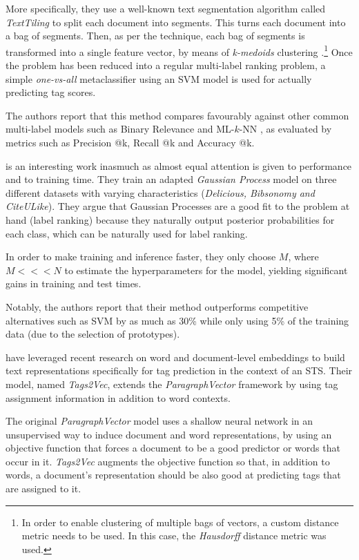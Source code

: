 More specifically, they use a well-known text segmentation algorithm called \textit{TextTiling} \citep{hearst_1994} to split each document into segments. This turns each document into a bag of segments. Then, as per the technique, each bag of segments is transformed into a single feature vector, by means of \textit{k-medoids} clustering \citep{kaufmanl_rousseeuw_1987}.\footnote{In order to enable clustering of multiple bags of vectors, a custom distance metric needs to be used. In this case, the  \textit{Hausdorff} distance metric \citep{huttenlocher_etal_1993} was used.} Once the problem has been reduced into a regular multi-label ranking problem, a simple \textit{one-vs-all} metaclassifier using an SVM model is used for actually predicting  tag scores.

The authors report that this method compares favourably against other common multi-label models such as Binary Relevance and ML-$k$-NN \citep{zhang_zhou_2007}, as evaluated by metrics such as Precision @k, Recall @k and Accuracy @k.

\cite{song_etal_2011} is an interesting work inasmuch as almost equal attention is given to performance and to training time. They train an adapted \textit{Gaussian Process} model on three different datasets with varying characteristics (\textit{Delicious, Bibsonomy and CiteULike}). They argue that Gaussian Processes are a good fit to the problem at hand (label ranking) because they naturally output posterior probabilities for each class, which can be naturally used for label ranking.

In order to make training and inference faster, they only choose $M$, where $M <<< N$ to estimate the hyperparameters for the model, yielding significant gains in training and test times.

Notably, the authors report that their method outperforms competitive alternatives such as SVM by as much as 30\% while only using 5\% of the training data (due to the selection of prototypes).

\cite{kataria_agarwal_2015} have leveraged recent research on word and document-level embeddings \citep{mikolov_etal_2013,le_mikolov_2014} to build text representations specifically for tag prediction in the context of an STS. Their model, named \textit{Tags2Vec}, extends the   \textit{ParagraphVector} framework by using tag assignment information in addition to word contexts. 

The original \textit{ParagraphVector} model uses a shallow neural network in an unsupervised way to induce document and word representations, by using an objective function that forces a document to be a good predictor or words that occur in it. \textit{Tags2Vec} augments the objective function so that, in addition to words, a document's representation should be also good at predicting tags that are assigned to it.

